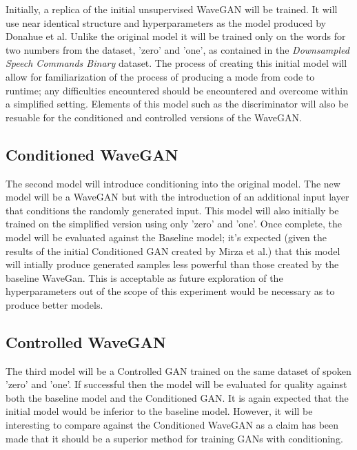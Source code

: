 \documentclass[titlepage]{article}
\begin{document}
Initially, a replica of the initial unsupervised WaveGAN will be trained.
It will use near identical structure and hyperparameters as the model produced by Donahue et al.
Unlike the original model it will be trained only on the words for two numbers from the dataset, 'zero' and 'one', as contained in the \textit{Downsampled Speech Commands Binary} dataset.
\newline
\newline
The process of creating this initial model will allow for familiarization of the process of producing a mode from code to runtime; any difficulties encountered should be encountered and overcome within a simplified setting.
Elements of this model such as the discriminator will also be resuable for the conditioned and controlled versions of the WaveGAN.

\subsection{Conditioned WaveGAN}

The second model will introduce conditioning into the original model.
The new model will be a WaveGAN but with the introduction of an additional input layer that conditions the randomly generated input.
This model will also initially be trained on the simplified version using only 'zero' and 'one'.
\newline
\newline
Once complete, the model will be evaluated against the Baseline model; it's expected (given the results of the initial Conditioned GAN created by Mirza et al.) that this model will intially produce generated samples less powerful than those created by the baseline WaveGan.
This is acceptable as future exploration of the hyperparameters out of the scope of this experiment would be necessary as to produce better models.

\subsection{Controlled WaveGAN}

The third model will be a Controlled GAN trained on the same dataset of spoken 'zero' and 'one'.
If successful then the model will be evaluated for quality against both the baseline model and the Conditioned GAN.
It is again expected that the initial model would be inferior to the baseline model.
However, it will be interesting to compare against the Conditioned WaveGAN as a claim has been made that it should be a superior method for training GANs with conditioning.
\end{document}

